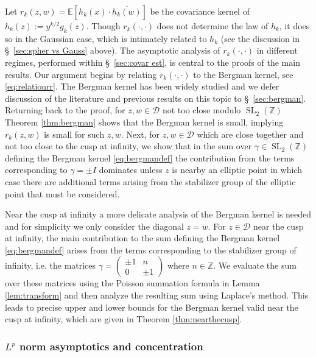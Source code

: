 \documentclass[12pt, a4paper]{amsart}
\newcommand{\tmop}[1]{\ensuremath{\operatorname{#1}}}
\theoremstyle{definition}
\newcommand {\E} {\mathbb{E}}
\newcommand {\1} {\mathbf{1}}
\newcommand {\Dc} {\mathcal{D}}
\numberwithin{equation}{section}
\begin{document}
Let $r_{k}(z,w)=\E[h_{k}(x)\cdot \overline{h_{k}(w)}]$ be the covariance kernel of $h_{k}(z):=y^{k/2}g_{k}(z)$. Though $r_{k}(\cdot,\cdot)$ does not determine the law of $h_{k}$,
it does so in the Gaussian case, which is intimately related to $h_{k}$ (see the discussion in \S~\ref{sec:spher vs Gauss} above).
The asymptotic analysis of $r_{k}(\cdot,\cdot)$ in different regimes, performed within \S~\ref{sec:covar est},
is central to the proofs of the main results. Our argument begins by relating $r_k(\cdot,\cdot)$ to the Bergman kernel, see \eqref{eq:relationrr}. The Bergman kernel has been widely studied and we defer discussion of the literature and previous results on this topic to \S~\ref{sec:bergman}.
Returning back to the proof, for $z,w \in \Dc$ not too close modulo $\tmop{SL}_2(\mathbb Z)$ Theorem \ref{thm:bergman} shows that the Bergman kernel is small, implying $r_k(z,w)$ is small for such $z,w$. Next, for $z,w \in \Dc$ which are close together and not too close to the cusp at infinity, we show that in the sum over $\gamma \in \tmop{SL}_2(\mathbb Z)$ defining the Bergman kernel \eqref{eq:bergmandef} the contribution from the terms corresponding to $\gamma=\pm I$ dominates unless $z$ is nearby an elliptic point in which case there are additional terms arising from the stabilizer group of the elliptic point that must be considered.

Near the cusp at infinity a more delicate analysis of the Bergman kernel is needed and for simplicity we only consider the diagonal $z=w$. For $z\in \Dc$ near the cusp at infinity, the main contribution to the sum defining the Bergman kernel \eqref{eq:bergmandef} arises from the terms corresponding to the stabilizer group of infinity, i.e. the matrices $\gamma=\begin{pmatrix} \pm 1 & n \\ 0 & \pm 1 \end{pmatrix}$ where $n \in \mathbb Z$. We evaluate the sum over these matrices using the Poisson summation formula in Lemma \ref{lem:transform} and then analyze the resulting sum using Laplace's method. This leads to precise upper and lower bounds for the Bergman kernel valid near the cusp at infinity, which are given in Theorem \ref{thm:nearthecusp}.



\subsubsection{{\bf \texorpdfstring{$L^p$}{Lp} norm asymptotics and concentration}}
\end{document}
